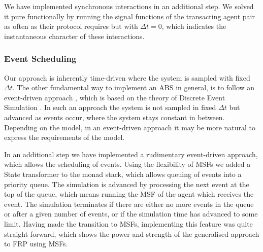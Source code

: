 We have implemented synchronous interactions in an additional step. We solved it pure functionally by running the signal functions of the transacting agent pair as often as their protocol requires but with $\Delta t=0$, which indicates the instantaneous character of these interactions.

\subsubsection{Event Scheduling}
Our approach is inherently time-driven where the system is sampled with fixed $\Delta t$. The other fundamental way to implement an ABS in general, is to follow an event-driven approach \cite{meyer_event-driven_2014}, which is based on the theory of Discrete Event Simulation \cite{zeigler_theory_2000}. In such an approach the system is not sampled in fixed $\Delta t$ but advanced as events occur, where the system stays constant in between. Depending on the model, in an event-driven approach it may be more natural to express the requirements of the model.

In an additional step we have implemented a rudimentary event-driven approach, which allows the scheduling of events. Using the flexibility of MSFs we added a State transformer to the monad stack, which allows queuing of events into a priority queue. The simulation is advanced by processing the next event at the top of the queue, which means running the MSF of the agent which receives the event. The simulation terminates if there are either no more events in the queue or after a given number of events, or if the simulation time has advanced to some limit. Having made the transition to MSFs, implementing this feature was quite straight forward, which shows the power and strength of the generalised approach to FRP using MSFs.


